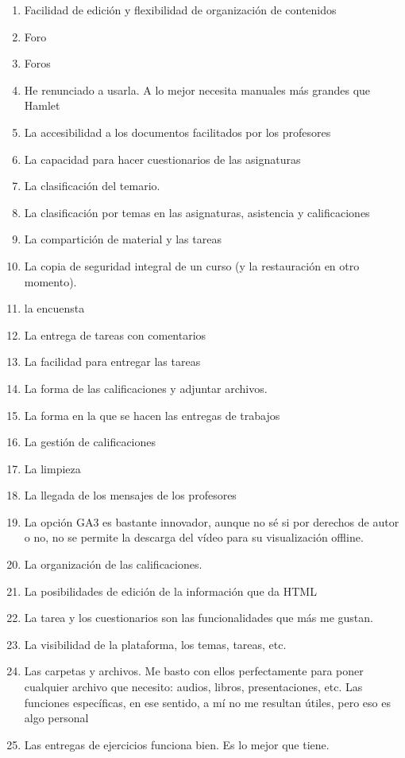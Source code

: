 \begin{enumerate}
\item Facilidad de edición y flexibilidad de organización de contenidos
\item Foro
\item Foros
\item He renunciado a usarla. A lo mejor necesita manuales más grandes que Hamlet
\item La accesibilidad a los documentos facilitados por los profesores
\item La capacidad para hacer cuestionarios de las asignaturas
\item La clasificación del temario.
\item La clasificación por temas en las asignaturas, asistencia y calificaciones
\item La compartición de material y las tareas
\item La copia de seguridad integral de un curso (y la restauración en otro momento).
\item la encuensta
\item La entrega de tareas con comentarios
\item La facilidad para entregar las tareas
\item La forma de las calificaciones y adjuntar archivos.
\item La forma en la que se hacen las entregas de trabajos
\item La gestión de calificaciones
\item La limpieza
\item La llegada de los mensajes de los profesores
\item La opción GA3 es bastante innovador, aunque no sé si por derechos de autor o no, no se permite la descarga del vídeo para su visualización offline.
\item La organización de las calificaciones.
\item La posibilidades de edición de la información que da HTML
\item La tarea y los cuestionarios son las funcionalidades que más me gustan.
\item La visibilidad de la plataforma, los temas, tareas, etc.
\item Las carpetas y archivos. Me basto con ellos perfectamente para poner cualquier archivo que necesito: audios, libros, presentaciones, etc. Las funciones específicas, en ese sentido, a mí no me resultan útiles, pero eso es algo personal
\item Las entregas de ejercicios funciona bien. Es lo mejor que tiene.

\end{enumerate}

